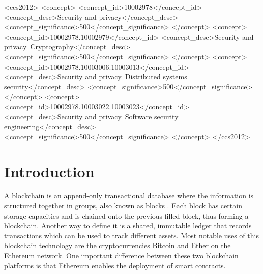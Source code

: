 \documentclass[sigconf]{acmart}
\begin{document}
\begin{CCSXML}
<ccs2012>
   <concept>
       <concept_id>10002978</concept_id>
       <concept_desc>Security and privacy</concept_desc>
       <concept_significance>500</concept_significance>
       </concept>
   <concept>
       <concept_id>10002978.10002979</concept_id>
       <concept_desc>Security and privacy~Cryptography</concept_desc>
       <concept_significance>500</concept_significance>
       </concept>
   <concept>
       <concept_id>10002978.10003006.10003013</concept_id>
       <concept_desc>Security and privacy~Distributed systems security</concept_desc>
       <concept_significance>500</concept_significance>
       </concept>
   <concept>
       <concept_id>10002978.10003022.10003023</concept_id>
       <concept_desc>Security and privacy~Software security engineering</concept_desc>
       <concept_significance>500</concept_significance>
       </concept>
 </ccs2012>
\end{CCSXML}



\maketitle

\section{Introduction}
A blockchain is an append-only transactional database where the information is structured together in groups, also known as blocks \cite{smart_inspect}\cite{smarter}. Each block has certain storage capacities and is chained onto the previous filled block, thus forming a blockchain. Another way to define it is a shared, immutable ledger that records transactions which can be used to track different assets. Most notable uses of this blockchain technology are the cryptocurrencies Bitcoin\cite{article} and Ether \cite{ethereum}\cite{white_paper} on the Ethereum network. One important difference between these two blockchain platforms is that Ethereum enables the deployment of smart contracts. 
\end{document}
